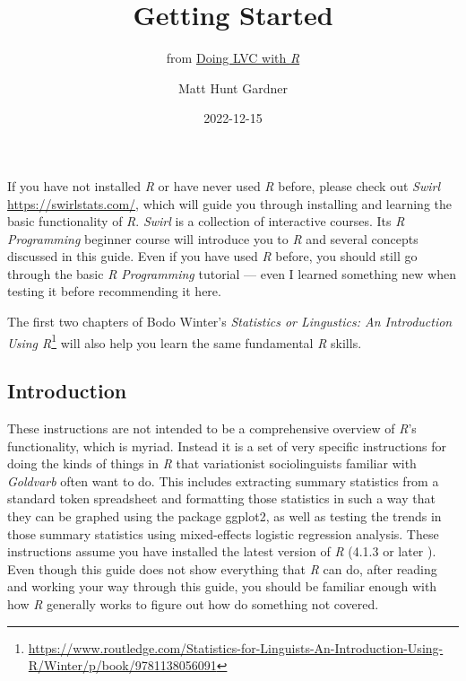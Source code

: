 \documentclass[
  10pt,
  letterpaper]{article}
\title{Getting Started}
\subtitle{from
\href{https://lingmethodshub.github.io/content/R/lvc_r/}{Doing LVC with
\emph{R}}}
\author{Matt Hunt Gardner}
\date{2022-12-15}
\renewcommand\texttt[1]{{\ttfamily\color{BrickRed}#1}}
\renewcommand*\contentsname{Table of contents}
\newcommand\contentsname{Table of contents}
\DeclareRobustCommand{\href}[2]{#2\footnote{\url{#1}}}
\begin{document}
\maketitle
\ifdefined\Shaded\renewenvironment{Shaded}{\begin{tcolorbox}[sharp corners, interior hidden, borderline west={3pt}{0pt}{shadecolor}, breakable, enhanced, boxrule=0pt, frame hidden]}{\end{tcolorbox}}\fi

\renewcommand*\contentsname{Table of contents}
{
\hypersetup{linkcolor=}
\setcounter{tocdepth}{3}
\tableofcontents
}
If you have not installed \emph{R} or have never used \emph{R} before,
please check out \emph{Swirl} \url{https://swirlstats.com/}, which will
guide you through installing and learning the basic functionality of
\emph{R}. \emph{Swirl} is a collection of interactive courses. Its
\emph{R Programming} beginner course will introduce you to \emph{R} and
several concepts discussed in this guide. Even if you have used \emph{R}
before, you should still go through the basic \emph{R Programming}
tutorial --- even I learned something new when testing it before
recommending it here.

The first two chapters of Bodo Winter's
\href{https://www.routledge.com/Statistics-for-Linguists-An-Introduction-Using-R/Winter/p/book/9781138056091}{\emph{Statistics
or Lingustics: An Introduction Using R}} will also help you learn the
same fundamental \emph{R} skills.

\hypertarget{introduction}{%
\subsection{Introduction}\label{introduction}}

These instructions are not intended to be a comprehensive overview of
\emph{R}'s functionality, which is myriad. Instead it is a set of very
specific instructions for doing the kinds of things in \emph{R} that
variationist sociolinguists familiar with \emph{Goldvarb} often want to
do. This includes extracting summary statistics from a standard token
spreadsheet and formatting those statistics in such a way that they can
be graphed using the package \texttt{ggplot2}, as well as testing the
trends in those summary statistics using mixed-effects logistic
regression analysis. These instructions assume you have installed the
latest version of \emph{R} (4.1.3 or later ). Even though this guide
does not show everything that \emph{R} can do, after reading and working
your way through this guide, you should be familiar enough with how
\emph{R} generally works to figure out how do something not covered.
\end{document}
